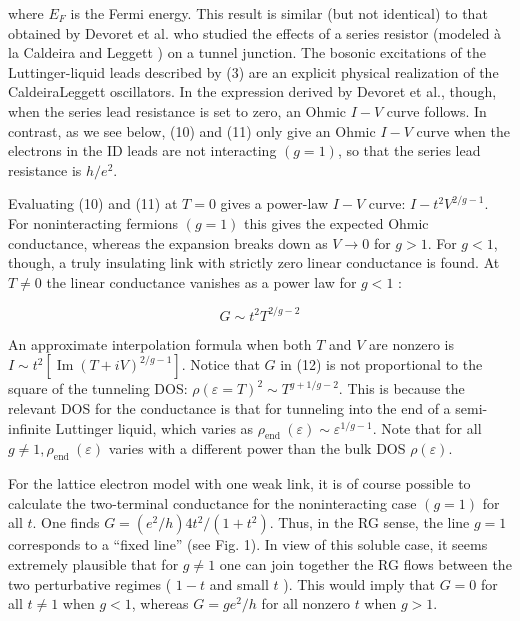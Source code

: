 \documentclass[11pt]{article}
\begin{document}
where $E_{F}$ is the Fermi energy. This result is similar (but not identical) to that obtained by Devoret et al. \cite{ref5} who studied the effects of a series resistor (modeled à la Caldeira and Leggett \cite{ref14}) on a tunnel junction. The bosonic excitations of the Luttinger-liquid leads described by (3) are an explicit physical realization of the CaldeiraLeggett oscillators. In the expression derived by Devoret et al., though, when the series lead resistance is set to zero, an Ohmic $I-V$ curve follows. In contrast, as we see below, (10) and (11) only give an Ohmic $I-V$ curve when the electrons in the ID leads are not interacting $(g=1)$, so that the series lead resistance is $h / e^{2}$.

Evaluating (10) and (11) at $T=0$ gives a power-law $I-V$ curve: $I-t^{2} V^{2 / g-1}$. For noninteracting fermions $(g=1)$ this gives the expected Ohmic conductance, whereas the expansion breaks down as $V \rightarrow 0$ for $g>1$. For $g<1$, though, a truly insulating link with strictly zero linear conductance is found. At $T \neq 0$ the linear conductance vanishes as a power law for $g<1$ :

\begin{equation}
G \sim t^{2} T^{2 / g-2} 
\end{equation}

An approximate interpolation formula when both $T$ and $V$ are nonzero is $I \sim t^{2}\left[\operatorname{Im}(T+i V)^{2 / g-1}\right]$. Notice that $G$ in (12) is not proportional to the square of the tunneling DOS: $\rho(\varepsilon=T)^{2} \sim T^{g+1 / g-2}$. This is because the relevant DOS for the conductance is that for tunneling into the end of a semi-infinite Luttinger liquid, which varies as $\rho_{\text {end }}(\varepsilon) \sim \varepsilon^{1 / g-1}$. Note that for all $g \neq 1, \rho_{\text {end }}(\varepsilon)$ varies with a different power than the bulk DOS $\rho(\varepsilon)$.

For the lattice electron model with one weak link, it is of course possible to calculate the two-terminal conductance for the noninteracting case $(g=1)$ for all $t$. One finds $G=\left(e^{2} / h\right) 4 t^{2} /\left(1+t^{2}\right)$. Thus, in the RG sense, the line $g=1$ corresponds to a ``fixed line'' (see Fig. 1). In view of this soluble case, it seems extremely plausible \cite{ref15} that for $g \neq 1$ one can join together the RG flows between the two perturbative regimes ( $1-t$ and small $t$ ). This would imply that $G=0$ for all $t \neq 1$ when $g<1$, whereas $G=g e^{2} / h$ for all nonzero $t$ when $g>1$.
\end{document}
